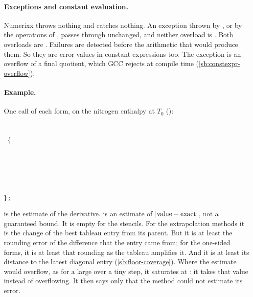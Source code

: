 \paragraph{Exceptions and constant evaluation.} Numerixx throws nothing and catches nothing. An exception thrown by
, or by the operations of , passes through unchanged, and neither overload is . Both
overloads are . Failures are detected before the arithmetic that would produce them. So they are
error values in constant expressions too. The exception is an overflow of a final quotient, which GCC rejects at
compile time (\cref{sb:constexpr-overflow}).

\paragraph{Example.} One call of each form, on the nitrogen enthalpy at $T_0$ ():

\section{\texorpdfstring{}{Estimate<T>}}\label{sec:api-estimate}

\begin{signature}
~\texttt{\{}\\
\sigindent{}\\
\sigindent{}\\
\sigindent{}\\
\sigindent{}\\
\sigindent\sigindent{}\\
\texttt{\};}
\end{signature}
 is the estimate of the derivative.  is an estimate of $\lvert \text{value} -
\text{exact} \rvert$, not a guaranteed bound. It is empty for the stencils. For the extrapolation methods it is the change
of the best tableau entry from its parent. But it is at least the rounding error of the difference that the entry came
from; for the one-sided forms, it is at least that rounding as the tableau amplifies it. And it is at least its
distance to the latest diagonal entry (\cref{sb:floor-coverage}). Where the estimate would overflow, as for a large
 over a tiny step, it saturates at : it takes that value instead of overflowing. It then says only
that the method could not estimate its error.

